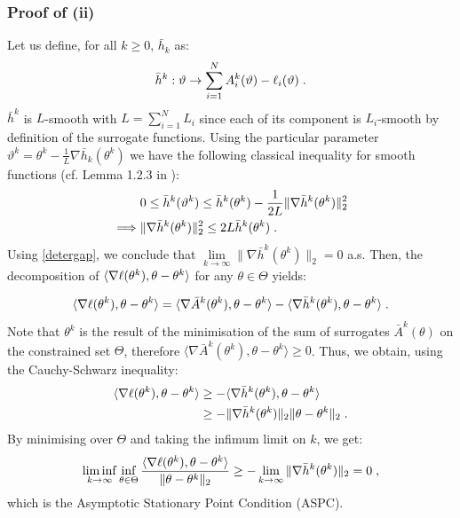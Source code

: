\documentclass[11pt]{article}
\theoremstyle{plain}
\begin{document}
\subsubsection{Proof of (ii)}
Let us define, for all $k \geq 0$, $\bar{h}_k$ as:
\begin{equation}\label{smoothH}
\bar{h}^k : \vartheta \to \sum_{i=1}^N{A^k_{i}(\vartheta) - \ell_i(\vartheta)}\;.
\end{equation}
$\bar{h}^k$ is $L$-smooth with $L = \sum_{i=1}^N{L_i}$ since each of its component is $L_i$-smooth by definition of the surrogate functions. Using the particular parameter $\vartheta^k = \theta^k - \frac{1}{L}\nabla\bar{h}_k(\theta^k) $ we have the following classical inequality for smooth functions (cf. Lemma 1.2.3 in \citep{nesterov2007Gradient}):
\begin{align}\label{nest}
& 0 \leq \bar{h}^k(\vartheta^k) \leq \bar{h}^k(\theta^k) - \frac{1}{2L}\|\nabla\bar{h}^k(\theta^k)\|_2^2\\
\implies &  \|\nabla\bar{h}^k(\theta^k)\|_2^2 \leq 2L\bar{h}^k(\theta^k)\;.
\end{align}
Using \eqref{detergap}, we conclude that $\lim \limits_{k \to \infty}\|\nabla\bar{h}^k(\theta^k)\|_2 = 0$ a.s. Then, the decomposition of $\langle \nabla \ell(\theta^k),\theta - \theta^k \rangle$ for any $\theta \in \Theta$ yields:

\begin{equation}
\langle \nabla \ell(\theta^k),\theta - \theta^k \rangle = \langle \nabla \bar{A}^k(\theta^k), \theta - \theta^k \rangle - \langle \nabla\bar{h}^k(\theta^k),\theta - \theta^k \rangle\;.
\end{equation}
Note that $\theta^k$ is the result of the minimisation of the sum of surrogates $\bar{A}^k(\theta)$ on the constrained set $\Theta$, therefore  $\langle \nabla \bar{A}^k(\theta^k), \theta - \theta^k \rangle \geq 0$. Thus, we obtain, using the Cauchy-Schwarz inequality:
\begin{align}
\langle \nabla \ell(\theta^k),\theta - \theta^k \rangle & \geq - \langle \nabla\bar{h}^k(\theta^k),\theta - \theta^k \rangle\\
& \geq - \|\nabla\bar{h}^k(\theta^k)\|_2 \|\theta - \theta^k\|_2 \;.
\end{align}
By minimising over $\Theta$ and taking the infimum limit on $k$, we get:
\begin{equation}
\liminf \limits_{k \to \infty}\inf \limits_{\theta \in \Theta} \frac{\langle \nabla \ell(\theta^k),\theta - \theta^k \rangle}{\|\theta - \theta^k\|_2} \geq - \lim \limits_{k \to \infty}\|\nabla\bar{h}^k(\theta^k)\|_2 = 0 \;,
\end{equation}
which is the Asymptotic Stationary Point Condition  (ASPC).
\clearpage



\newpage
\printglossaries
\end{document}
